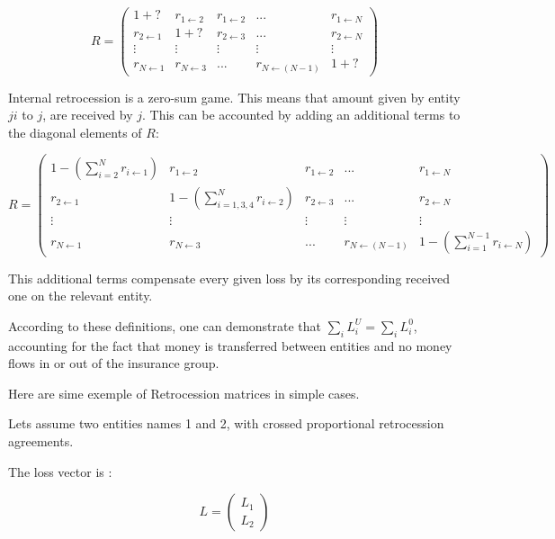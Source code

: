 \begin{equation}
R = 
\begin{pmatrix}
1 + ? & r_{1 \gets 2} & r_{1 \gets 2} & ... & r_{1 \gets N}\\
r_{2 \gets 1} & 1 + ? & r_{2 \gets 3} & ... & r_{2 \gets N}\\
\vdots & \vdots & \vdots & \vdots & \vdots\\
r_{N \gets 1} & r_{N \gets 3} & ... & r_{N \gets (N-1)} & 1 + ?
\end{pmatrix}
\end{equation}


Internal retrocession is a zero-sum game. This means that amount given by entity $ji$ to $j$, are received by $j$. This can be accounted by adding an additional terms to the diagonal elements of $R$:

\begin{equation}
R = 
\begin{pmatrix}
1 - (\sum_{i=2}^{N} r_{i \gets 1}) & r_{1 \gets 2} & r_{1 \gets 2} & ... & r_{1 \gets N}\\
r_{2 \gets 1} & 1 - (\sum_{i={1, 3, 4}}^{N} r_{i \gets 2}) & r_{2 \gets 3} & ... & r_{2 \gets N}\\
\vdots & \vdots & \vdots & \vdots & \vdots\\
r_{N \gets 1} & r_{N \gets 3} & ... & r_{N \gets (N-1)} & 1 - (\sum_{i={1}}^{N-1} r_{i \gets N})
\end{pmatrix}
\end{equation}

This additional terms compensate every given loss by its corresponding received one on the relevant entity.

According to these definitions, one can demonstrate that $\sum_i L_i^U = \sum_i L_i^0$, accounting for the fact that money is transferred between entities and no money flows in or out of the insurance group.



Here are sime exemple of Retrocession matrices in simple cases.

Lets assume two entities names 1 and 2, with crossed proportional retrocession agreements.

The loss vector is : 

\begin{equation}
L = 
\begin{pmatrix}
L_1 \\
L_2
\end{pmatrix}
\end{equation}

